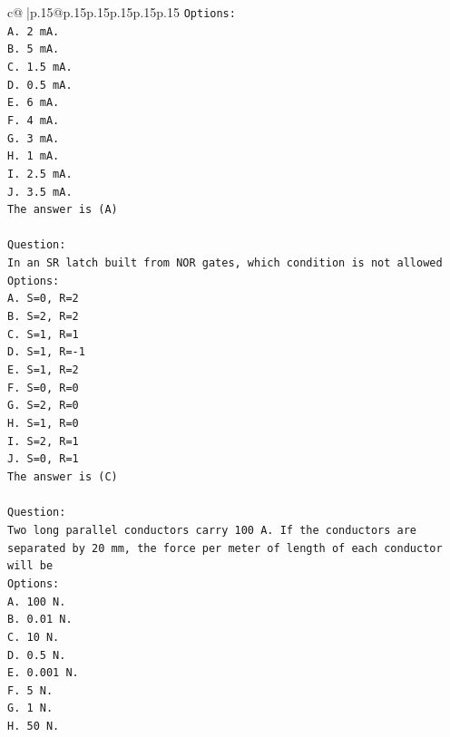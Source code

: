 \documentclass{article}
\begin{document}
{\begin{supertabular}{c@{$\;$}|p{.15\linewidth}@{}p{.15\linewidth}p{.15\linewidth}p{.15\linewidth}p{.15\linewidth}p{.15\linewidth}}
{{{\texttt{Options:} \\
\texttt{A. 2 mA.} \\
\texttt{B. 5 mA.} \\
\texttt{C. 1.5 mA.} \\
\texttt{D. 0.5 mA.} \\
\texttt{E. 6 mA.} \\
\texttt{F. 4 mA.} \\
\texttt{G. 3 mA.} \\
\texttt{H. 1 mA.} \\
\texttt{I. 2.5 mA.} \\
\texttt{J. 3.5 mA.} \\
\texttt{The answer is (A)} \\
\\ 
\texttt{Question:} \\
\texttt{In an SR latch built from NOR gates, which condition is not allowed} \\
\texttt{Options:} \\
\texttt{A. S=0, R=2} \\
\texttt{B. S=2, R=2} \\
\texttt{C. S=1, R=1} \\
\texttt{D. S=1, R={-}1} \\
\texttt{E. S=1, R=2} \\
\texttt{F. S=0, R=0} \\
\texttt{G. S=2, R=0} \\
\texttt{H. S=1, R=0} \\
\texttt{I. S=2, R=1} \\
\texttt{J. S=0, R=1} \\
\texttt{The answer is (C)} \\
\\ 
\texttt{Question:} \\
\texttt{Two long parallel conductors carry 100 A. If the conductors are separated by 20 mm, the force per meter of length of each conductor will be} \\
\texttt{Options:} \\
\texttt{A. 100 N.} \\
\texttt{B. 0.01 N.} \\
\texttt{C. 10 N.} \\
\texttt{D. 0.5 N.} \\
\texttt{E. 0.001 N.} \\
\texttt{F. 5 N.} \\
\texttt{G. 1 N.} \\
\texttt{H. 50 N.} \\
}}}
\end{supertabular}}
\end{document}
